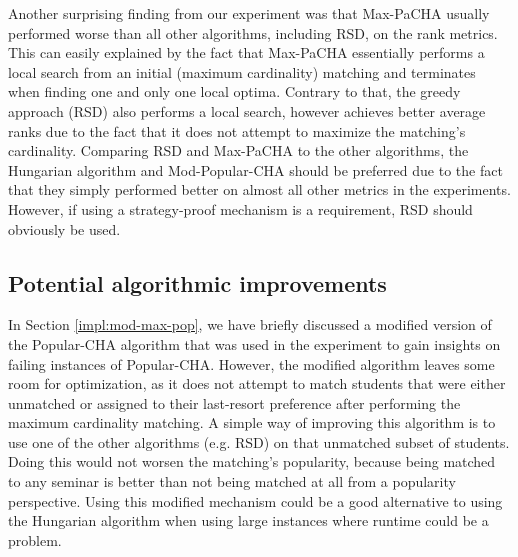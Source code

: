 Another surprising finding from our experiment was that Max-PaCHA usually performed worse than all other algorithms, including RSD, on the rank metrics. This can easily explained by the fact that Max-PaCHA essentially performs a local search from an initial (maximum cardinality) matching and terminates when finding one and only one local optima. Contrary to that, the greedy approach (RSD) also performs a local search, however achieves better average ranks due to the fact that it does not attempt to maximize the matching's cardinality. Comparing RSD and Max-PaCHA to the other algorithms, the Hungarian algorithm and Mod-Popular-CHA should be preferred due to the fact that they simply performed better on almost all other metrics in the experiments. However, if using a strategy-proof mechanism is a requirement, RSD should obviously be used.

\subsection{Potential algorithmic improvements}\label{sec:improvements}
In Section \ref{impl:mod-max-pop}, we have briefly discussed a modified version of the Popular-CHA algorithm that was used in the experiment to gain insights on failing instances of Popular-CHA. However, the modified algorithm leaves some room for optimization, as it does not attempt to match students that were either unmatched or assigned to their last-resort preference after performing the maximum cardinality matching. A simple way of improving this algorithm is to use one of the other algorithms (e.g. RSD) on that unmatched subset of students. Doing this would not worsen the matching's popularity, because being matched to any seminar is better than not being matched at all from a popularity perspective. Using this modified mechanism could be a good alternative to using the Hungarian algorithm when using large instances where runtime could be a problem. 


